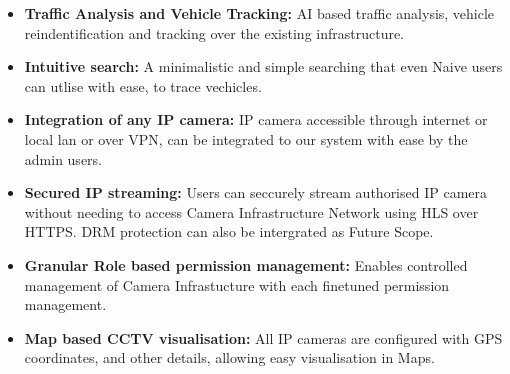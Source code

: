 \begin{itemize}
	\item \textbf{Traffic Analysis and Vehicle Tracking:} AI based traffic analysis, vehicle reindentification and tracking over the existing infrastructure. 
	\item \textbf{Intuitive search:} A minimalistic and simple searching that even Naive users can utlise with ease, to trace vechicles.   
	\item \textbf{Integration of any IP camera:} IP camera accessible through internet or local lan or over VPN, can be integrated to our system with ease by the admin users.
	\item \textbf{Secured IP streaming:} Users can seccurely stream authorised IP camera without needing to access Camera Infrastructure Network using HLS over HTTPS. DRM protection can also be intergrated as Future Scope.
	\item \textbf{Granular Role based permission management:} Enables controlled management of Camera Infrastucture with each finetuned permission management.
	\item  \textbf{Map based CCTV visualisation:} All IP cameras are configured with GPS coordinates, and other details, allowing easy visualisation in Maps. 
\end{itemize}